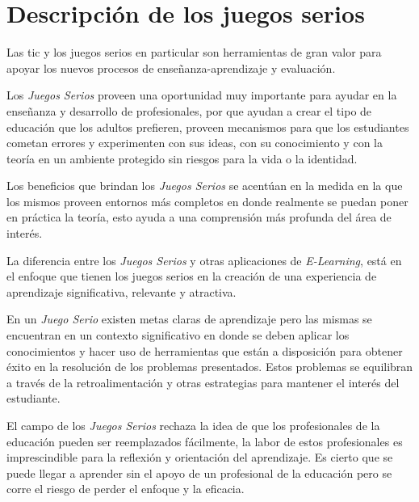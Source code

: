 \section{Descripción de los juegos serios}

Las \Gls{tic} y los juegos serios en particular son herramientas de gran valor
para apoyar los nuevos procesos de enseñanza-aprendizaje y
evaluación\cite{guenaga2013serious}. 


Los \emph{Juegos Serios} proveen una oportunidad muy importante para ayudar en
la enseñanza y desarrollo de profesionales\cite{mariluz:seiousgames}, por que
ayudan a crear el tipo de educación que los adultos prefieren, proveen
mecanismos para que los estudiantes cometan errores y experimenten con sus
ideas, con su conocimiento y con la teoría en un ambiente protegido sin riesgos
para la vida o la identidad\cite{sg:aoverview,education:games}. 

Los beneficios que brindan los \emph{Juegos Serios} se acentúan en la medida en
la que los mismos proveen entornos más completos en donde realmente se puedan
poner en práctica la teoría, esto ayuda a una comprensión más profunda del área
de interés\cite{sg:aoverview}.

La diferencia entre los \emph{Juegos Serios} y otras aplicaciones de
\emph{E-Learning}, está en el enfoque que tienen los juegos serios en la creación
de una experiencia de aprendizaje significativa, relevante y
atractiva\cite{sg:aoverview}.

En un \emph{Juego Serio} existen metas claras de aprendizaje pero las mismas se
encuentran en un contexto significativo en donde se deben aplicar los
conocimientos y hacer uso de herramientas que están a disposición para obtener
éxito en la resolución de los problemas presentados. Estos problemas se
equilibran a través de la retroalimentación y otras estrategias para mantener el
interés del estudiante\cite{sg:aoverview}.

El campo de los \emph{Juegos Serios} rechaza la idea de que los profesionales de
la educación pueden ser reemplazados fácilmente, la labor de estos profesionales
es imprescindible para la reflexión y orientación del
aprendizaje\cite{elearning:seiousgames}. Es cierto que se puede llegar a
aprender sin el apoyo de un profesional de la educación pero se corre el riesgo
de perder el enfoque y la eficacia\cite{elearning:seiousgames}. 

